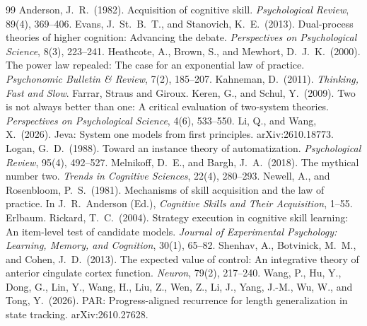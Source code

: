 \documentclass[11pt]{article}
\theoremstyle{definition}
\begin{document}
\begin{thebibliography}{99}
 Anderson, J.\ R.\ (1982). Acquisition of cognitive skill. \emph{Psychological Review}, 89(4), 369--406.
 Evans, J.\ St.\ B.\ T., and Stanovich, K.\ E.\ (2013). Dual-process theories of higher cognition: Advancing the debate. \emph{Perspectives on Psychological Science}, 8(3), 223--241.
 Heathcote, A., Brown, S., and Mewhort, D.\ J.\ K.\ (2000). The power law repealed: The case for an exponential law of practice. \emph{Psychonomic Bulletin \& Review}, 7(2), 185--207.
 Kahneman, D.\ (2011). \emph{Thinking, Fast and Slow}. Farrar, Straus and Giroux.
 Keren, G., and Schul, Y.\ (2009). Two is not always better than one: A critical evaluation of two-system theories. \emph{Perspectives on Psychological Science}, 4(6), 533--550.
 Li, Q., and Wang, X.\ (2026). Jeva: System one models from first principles. arXiv:2610.18773.
 Logan, G.\ D.\ (1988). Toward an instance theory of automatization. \emph{Psychological Review}, 95(4), 492--527.
 Melnikoff, D.\ E., and Bargh, J.\ A.\ (2018). The mythical number two. \emph{Trends in Cognitive Sciences}, 22(4), 280--293.
 Newell, A., and Rosenbloom, P.\ S.\ (1981). Mechanisms of skill acquisition and the law of practice. In J.\ R.\ Anderson (Ed.), \emph{Cognitive Skills and Their Acquisition}, 1--55. Erlbaum.
 Rickard, T.\ C.\ (2004). Strategy execution in cognitive skill learning: An item-level test of candidate models. \emph{Journal of Experimental Psychology: Learning, Memory, and Cognition}, 30(1), 65--82.
 Shenhav, A., Botvinick, M.\ M., and Cohen, J.\ D.\ (2013). The expected value of control: An integrative theory of anterior cingulate cortex function. \emph{Neuron}, 79(2), 217--240.
 Wang, P., Hu, Y., Dong, G., Lin, Y., Wang, H., Liu, Z., Wen, Z., Li, J., Yang, J.-M., Wu, W., and Tong, Y.\ (2026). PAR: Progress-aligned recurrence for length generalization in state tracking. arXiv:2610.27628.
\end{thebibliography}
\end{document}
